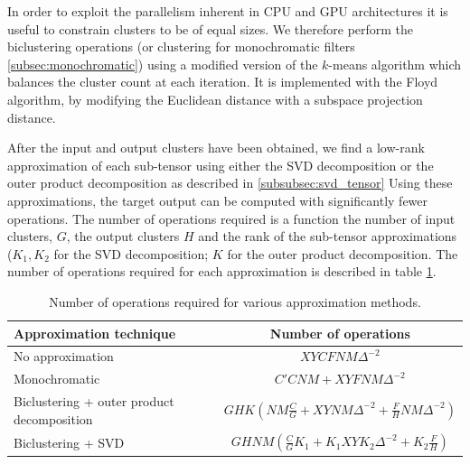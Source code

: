 In order to exploit the parallelism inherent in CPU and GPU
architectures it is useful to constrain clusters to be of equal sizes.
We therefore perform the biclustering operations (or clustering 
for monochromatic filters \ref{subsec:monochromatic}) using a modified
version of the $k$-means algorithm which balances the cluster count at
each iteration. 
It is implemented with the Floyd algorithm, by modifying the Euclidean distance
with a subspace projection distance.

After the input and output clusters have been obtained, we find a low-rank approximation of each 
sub-tensor using either the SVD decomposition or the outer product decomposition as described in \ref{subsubsec:svd_tensor}   
Using these approximations, the target
output can be computed with significantly fewer operations. The number
of operations required is a function the number
of input clusters, $G$, the output clusters $H$ and the rank of the sub-tensor 
approximations ($K_1, K_2$ for the SVD decomposition; $K$ for the outer product decomposition.  
The number of operations required for each approximation is described in table \ref{table:ops}.



\begin{table}[t]
\tiny
\centering
\begin{tabular}{lc}
\hline
Approximation technique & Number of operations \\
\hline
No approximation & $X Y C F N M \Delta^{-2}$\\
Monochromatic & $C' C N M + X Y F N M \Delta^{-2}$\\
Biclustering + outer product decomposition & $G H K (N M \frac{C}{G} + X Y N M \Delta^{-2} + \frac{F}{H} N M \Delta^{-2})$ \\  
Biclustering + SVD & $G H N M (\frac{C}{G}K_1 + K_1 X Y K_2 \Delta^{-2} + K_2\frac{F}{H})$\\
\end{tabular}
\caption{Number of operations required for various approximation methods.} 
\label{table:ops}
\end{table}

%
%
%





